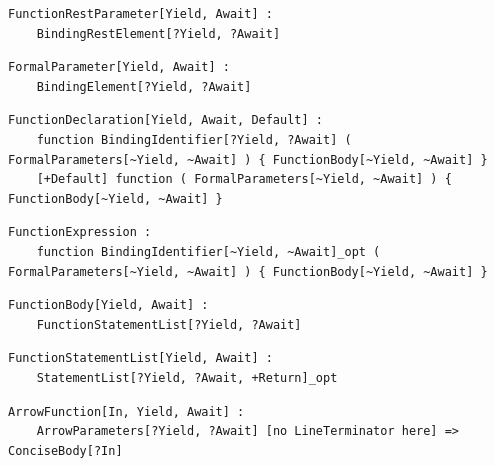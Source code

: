 \noindent\textbf{\texttt{}}\par
\begin{lstlisting}
FunctionRestParameter[Yield, Await] :
    BindingRestElement[?Yield, ?Await]
\end{lstlisting}

\noindent\textbf{\texttt{}}\par
\begin{lstlisting}
FormalParameter[Yield, Await] :
    BindingElement[?Yield, ?Await]
\end{lstlisting}

\noindent\textbf{\texttt{}}\par
\begin{lstlisting}
FunctionDeclaration[Yield, Await, Default] :
    function BindingIdentifier[?Yield, ?Await] ( FormalParameters[~Yield, ~Await] ) { FunctionBody[~Yield, ~Await] }
    [+Default] function ( FormalParameters[~Yield, ~Await] ) { FunctionBody[~Yield, ~Await] }
\end{lstlisting}

\noindent\textbf{\texttt{}}\par
\begin{lstlisting}
FunctionExpression :
    function BindingIdentifier[~Yield, ~Await]_opt ( FormalParameters[~Yield, ~Await] ) { FunctionBody[~Yield, ~Await] }
\end{lstlisting}

\noindent\textbf{\texttt{}}\par
\begin{lstlisting}
FunctionBody[Yield, Await] :
    FunctionStatementList[?Yield, ?Await]
\end{lstlisting}

\noindent\textbf{\texttt{}}\par
\begin{lstlisting}
FunctionStatementList[Yield, Await] :
    StatementList[?Yield, ?Await, +Return]_opt
\end{lstlisting}

\noindent\textbf{\texttt{}}\par
\begin{lstlisting}
ArrowFunction[In, Yield, Await] :
    ArrowParameters[?Yield, ?Await] [no LineTerminator here] => ConciseBody[?In]
\end{lstlisting}

